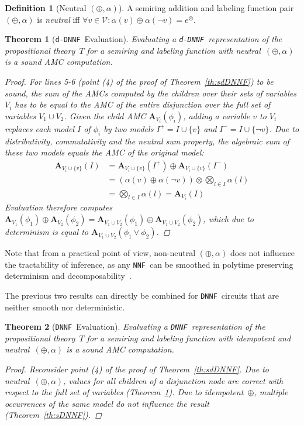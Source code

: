 \documentclass{article}
\theoremstyle{plain}
\newtheorem{theorem}{Theorem}
\theoremstyle{definition}
\newtheorem{definition}{Definition}
\newcommand{\NNF}{{\tt NNF}}
\newcommand{\DNNF}{{\tt DNNF}}
\newcommand{\dDNNF}{{\tt d-DNNF}}
\begin{document}
\begin{definition}[Neutral $(\oplus,\alpha)$]
  A semiring addition and labeling function pair~$(\oplus,\alpha)$ is 
  \emph{neutral} iff $\forall v \in \mathcal{V}: \alpha(v) \oplus \alpha(\neg v) =  e^{\otimes}$.
\end{definition}

\begin{theorem}[\dDNNF\ Evaluation] \label{th:dDNNF}
  Evaluating a \dDNNF\ representation of the propositional theory~$T$
  for a semiring and labeling function with  neutral~$(\oplus,\alpha)$
  is a sound AMC computation.
  \begin{proof}
For lines 5-6 (point (4) of the proof of Theorem~\ref{th:sdDNNF}) to
be sound, the sum of the  AMCs computed by the children over their
sets of variables $V_i$ has to be equal to the AMC of the entire disjunction
over the full set of variables $V_1 \cup V_2$. Given the child AMC
$\mathbf{A}_{V_i}(\phi_i)$, adding a variable $v$ to $V_i$ replaces
each model $I$ of $\phi_i$ by two models $I^+=I\cup \{v\}$ and $I^-
= I\cup \{\neg v\}$.
Due to distributivity, commutativity and the neutral sum property, the algebraic sum of these two models equals the AMC of the original model:
\begin{align*}
\mathbf{A}_{V_i \cup \{v\}}(I) &= \mathbf{A}_{V_i \cup \{v\}}(I^+) \oplus \mathbf{A}_{V_i \cup \{v\}}(I^-) \\
&= (\alpha(v)\oplus\alpha(\neg v)) \otimes \bigotimes_{l\in I}\alpha(l) \\
&= \bigotimes_{l\in I}\alpha(l)= \mathbf{A}_{V_i}(I)
\end{align*}
Evaluation therefore computes $\mathbf{A}_{V_1}(\phi_1)\oplus
\mathbf{A}_{V_2}(\phi_2)=\mathbf{A}_{V_1\cup V_2}(\phi_1)\oplus
\mathbf{A}_{V_1\cup V_2}(\phi_2)$, which due to determinism is equal
to $\mathbf{A}_{V_1\cup V_2}(\phi_1\vee \phi_2)$.
  \end{proof}
\end{theorem}

Note that from a practical point of view, non-neutral
$(\oplus,\alpha)$ does not influence the tractability of inference, as
any \NNF\ can be smoothed 
in polytime preserving determinism and decomposability~\citep{darwiche2002knowledge}.


The previous two results can directly be combined for \DNNF\ circuits
that are neither smooth nor deterministic.
\begin{theorem}[\DNNF\ Evaluation] \label{th:DNNF}
  Evaluating a \DNNF\ representation of the propositional theory~$T$
  for a semiring and labeling function with idempotent and  neutral~$(\oplus,\alpha)$
  is a sound AMC computation.
\begin{proof}
Reconsider point (4) of the proof of Theorem~\ref{th:sdDNNF}.
Due to neutral~$(\oplus,\alpha)$, values for all children of a disjunction node are
correct with respect to the full set of variables
(Theorem~\ref{th:dDNNF}). Due to idempotent~$\oplus$, multiple occurrences  of the same model
do not influence the result (Theorem~\ref{th:sDNNF}). 
  \end{proof}
\end{theorem}
\end{document}
